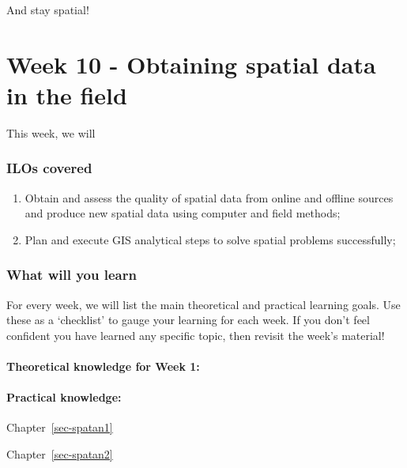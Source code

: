 \documentclass[
  letterpaper,
  DIV=11,
  numbers=noendperiod]{scrreprt}
\begin{document}
And stay spatial!

\part{Week 10 - Obtaining spatial data in the field}

This week, we will

\section*{ILOs covered}\label{ilos-covered-7}


\begin{enumerate}
\def\labelenumi{\arabic{enumi}.}
\setcounter{enumi}{1}
\item
  Obtain and assess the quality of spatial data from online and offline
  sources and produce new spatial data using computer and field methods;
\item
  Plan and execute GIS analytical steps to solve spatial problems
  successfully;
\end{enumerate}

\section*{What will you learn}\label{what-will-you-learn-7}


For every week, we will list the main theoretical and practical learning
goals. Use these as a `checklist' to gauge your learning for each week.
If you don't feel confident you have learned any specific topic, then
revisit the week's material!

\subsection*{Theoretical knowledge for Week
1:}\label{theoretical-knowledge-for-week-1-1}

\subsection*{Practical knowledge:}\label{practical-knowledge-7}

Chapter~\ref{sec-spatan1}

Chapter~\ref{sec-spatan2}
\end{document}
